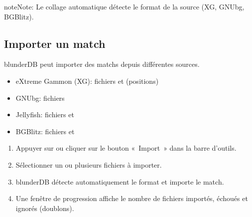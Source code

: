 \documentclass[letterpaper,10pt,french]{sphinxmanual}
\begin{document}
\begin{sphinxadmonition}{note}{Note:}
\sphinxAtStartPar
Le collage automatique détecte le format de la source (XG, GNUbg, BGBlitz).
\end{sphinxadmonition}


\subsection{Importer un match}
\label{\detokenize{guide_utilisateur:importer-un-match}}
\sphinxAtStartPar
blunderDB peut importer des matchs depuis différentes sources.

\sphinxAtStartPar
{}
\begin{itemize}
\item {} 
\sphinxAtStartPar
eXtreme Gammon (XG): fichiers  et  (positions)

\item {} 
\sphinxAtStartPar
GNUbg: fichiers 

\item {} 
\sphinxAtStartPar
Jellyfish: fichiers  et 

\item {} 
\sphinxAtStartPar
BGBlitz: fichiers  et 

\end{itemize}

\sphinxAtStartPar
{}
\begin{enumerate}
%
\item {} 
\sphinxAtStartPar
Appuyer sur  ou cliquer sur le bouton « Import » dans la barre d’outils.

\item {} 
\sphinxAtStartPar
Sélectionner un ou plusieurs fichiers à importer.

\item {} 
\sphinxAtStartPar
blunderDB détecte automatiquement le format et importe le match.

\item {} 
\sphinxAtStartPar
Une fenêtre de progression affiche le nombre de fichiers importés, échoués
et ignorés (doublons).

\end{enumerate}
\end{document}
